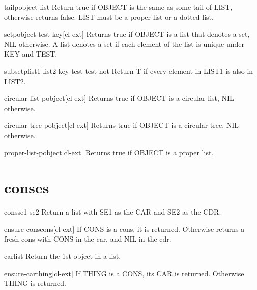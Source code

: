 \documentclass[10pt,english]{book}
\begin{document}
\begin{function}{tailp}{object list}
  Return true if OBJECT is the same as some tail of LIST, otherwise
   returns false. LIST must be a proper list or a dotted list.
\end{function}

\begin{function}{setp}{object \key test key}[cl-ext]
  Returns true if OBJECT is a list that denotes a set, NIL otherwise. A list
denotes a set if each element of the list is unique under KEY and TEST.
\end{function}

\begin{function}{subsetp}{list1 list2 \key key test test-not}
  Return T if every element in LIST1 is also in LIST2.
\end{function}

\begin{function}{circular-list-p}{object}[cl-ext]
  Returns true if OBJECT is a circular list, NIL otherwise.
\end{function}

\begin{function}{circular-tree-p}{object}[cl-ext]
  Returns true if OBJECT is a circular tree, NIL otherwise.
\end{function}

\begin{function}{proper-list-p}{object}[cl-ext]
  Returns true if OBJECT is a proper list.
\end{function}

\section{conses}
\label{sec:conses}

\begin{function}{cons}{se1 se2}
  Return a list with SE1 as the CAR and SE2 as the CDR.
\end{function}

\begin{function}{ensure-cons}{cons}[cl-ext]
  If CONS is a cons, it is returned. Otherwise returns a fresh cons with CONS
  in the car, and NIL in the cdr.
\end{function}

\begin{accessor}{car}{list}
  Return the 1st object in a list.
\end{accessor}

\begin{function}{ensure-car}{thing}[cl-ext]
  If THING is a CONS, its CAR is returned. Otherwise THING is returned.
\end{function}
\end{document}
